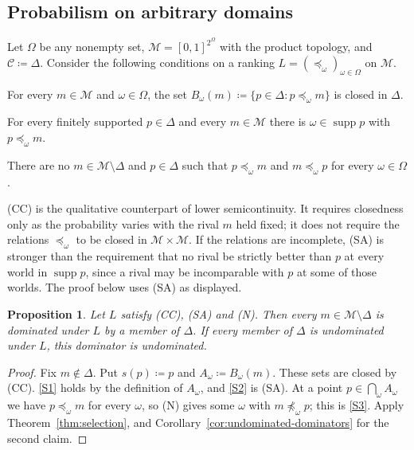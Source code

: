 \documentclass[11pt]{article}
\newenvironment{chgblockb}{\color{red}}{}
\newtheorem{proposition}[theorem]{Proposition}
\theoremstyle{definition}
\theoremstyle{remark}
\newcommand{\M}{\mathcal M}
\newcommand{\C}{\mathcal C}
\newcommand{\supp}{\operatorname{supp}}
\begin{document}
\subsection{Probabilism on arbitrary domains}\label{sec:probabilism}

\begin{chgblockb}
Let $\Omega$ be any nonempty set, $\M=[0,1]^{2^\Omega}$ with the product topology, and $\C\coloneqq\Delta$. Consider the following conditions on a ranking $L=(\preceq_\omega)_{\omega\in\Omega}$ on $\M$.
\begin{description}[leftmargin=1.5em,font=\normalfont\bfseries]
\item[(CC) Closed comparisons.] For every $m\in\M$ and $\omega\in\Omega$, the set $B_\omega(m)\coloneqq\{p\in\Delta:p\preceq_\omega m\}$ is closed in $\Delta$.
\item[(SA) Support coverage.] For every finitely supported $p\in\Delta$ and every $m\in\M$ there is $\omega\in\supp p$ with $p\preceq_\omega m$.
\item[(N) No incoherent ties.] There are no $m\in\M\setminus\Delta$ and $p\in\Delta$ such that $p\preceq_\omega m$ and $m\preceq_\omega p$ for every $\omega\in\Omega$.
\end{description}
(CC) is the qualitative counterpart of lower semicontinuity. It requires closedness only as the probability varies with the rival $m$ held fixed; it does not require the relations $\preceq_\omega$ to be closed in $\M\times\M$. If the relations are incomplete, (SA) is stronger than the requirement that no rival be strictly better than $p$ at every world in $\supp p$, since a rival may be incomparable with $p$ at some of those worlds. The proof below uses (SA) as displayed.

\begin{proposition}\label{prop:probabilism}
Let $L$ satisfy (CC), (SA) and (N). Then every $m\in\M\setminus\Delta$ is dominated under $L$ by a member of $\Delta$. If every member of $\Delta$ is undominated under $L$, this dominator is undominated.
\end{proposition}
\begin{proof}
Fix $m\notin\Delta$. Put $s(p)\coloneqq p$ and $A_\omega\coloneqq B_\omega(m)$. These sets are closed by (CC). \ref{S1} holds by the definition of $A_\omega$, and \ref{S2} is (SA). At a point $p\in\bigcap_\omega A_\omega$ we have $p\preceq_\omega m$ for every $\omega$, so (N) gives some $\omega$ with $m\not\preceq_\omega p$; this is \ref{S3}. Apply Theorem~\ref{thm:selection}, and Corollary~\ref{cor:undominated-dominators} for the second claim.
\end{proof}


\end{chgblockb}
\end{document}
